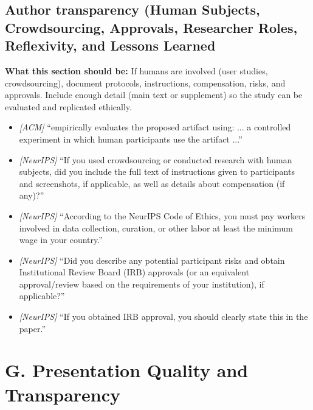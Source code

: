 \documentclass[11pt]{article}
\begin{document}
\subsection{Author transparency (Human Subjects, Crowdsourcing, Approvals, Researcher Roles, Reflexivity, and Lessons Learned}
\noindent\textbf{What this section should be:}
If humans are involved (user studies, crowdsourcing), document protocols, instructions, compensation, risks, and approvals. Include enough detail (main text or supplement) so the study can be evaluated and replicated ethically.
\begin{itemize}
  \item \textit{[ACM]} ``empirically evaluates the proposed artifact using: ... a controlled experiment in which human participants use the artifact ...''
  \item \textit{[NeurIPS]} ``If you used crowdsourcing or conducted research with human subjects, did you include the full text of instructions given to participants and screenshots, if applicable, as well as details about compensation (if any)?''
  \item \textit{[NeurIPS]} ``According to the NeurIPS Code of Ethics, you must pay workers involved in data collection, curation, or other labor at least the minimum wage in your country.''
  \item \textit{[NeurIPS]} ``Did you describe any potential participant risks and obtain Institutional Review Board (IRB) approvals (or an equivalent approval/review based on the requirements of your institution), if applicable?''
  \item \textit{[NeurIPS]} ``If you obtained IRB approval, you should clearly state this in the paper.''
\end{itemize}

\section*{G. Presentation Quality and Transparency}
\end{document}
